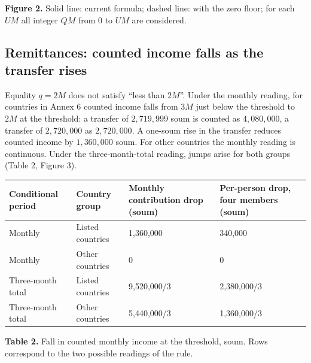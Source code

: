 \documentclass[12pt,a4paper]{extarticle}
\begin{document}
\begin{center}
\end{center}
\textbf{Figure 2.} Solid line: current formula; dashed line: with the zero floor; for each $UM$ all integer $QM$ from $0$ to $UM$ are considered.

\subsection{Remittances: counted income falls as the transfer rises}
Equality $q=2M$ does not satisfy “less than $2M$”. Under the monthly reading, for countries in Annex 6 counted income falls from $3M$ just below the threshold to $2M$ at the threshold: a transfer of $2{,}719{,}999$ soum is counted as $4{,}080{,}000$, a transfer of $2{,}720{,}000$ as $2{,}720{,}000$. A one-soum rise in the transfer reduces counted income by $1{,}360{,}000$ soum. For other countries the monthly reading is continuous. Under the three-month-total reading, jumps arise for both groups (Table 2, Figure 3).

\begingroup\fontsize{11bp}{13.2bp}\selectfont
\begin{longtable}{p{} p{} p{} p{}}
\toprule
Conditional period & Country group & Monthly contribution drop (soum) & Per-person drop, four members (soum) \\
\midrule
\endhead
Monthly & Listed countries & 1,360,000 & 340,000 \\
Monthly & Other countries & 0 & 0 \\
Three-month total & Listed countries & 9,520,000/3 & 2,380,000/3 \\
Three-month total & Other countries & 5,440,000/3 & 1,360,000/3 \\
\bottomrule
\end{longtable}
\endgroup
\textbf{Table 2.} Fall in counted monthly income at the threshold, soum. Rows correspond to the two possible readings of the rule.
\end{document}
